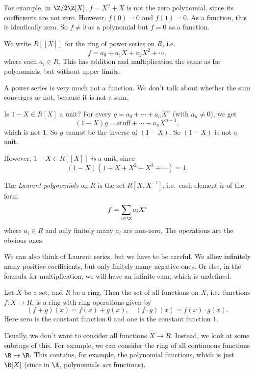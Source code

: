 \documentclass[a4paper]{article}
\begin{document}
For example, in $\Z/2\Z [X]$, $f = X^2 + X$ is not the zero polynomial, since its coefficients are not zero. However, $f(0) = 0$ and $f(1) = 0$. As a function, this is identically zero. So $f \not= 0$ as a polynomial but $f = 0$ as a function.

\begin{defi}
  We write $R[[X]]$ for the ring of power series on $R$, i.e.
  \[
    f = a_0 + a_1 X + a_2 X^2 + \cdots,
  \]
  where each $a_i \in R$. This has addition and multiplication the same as for polynomials, but without upper limits.
\end{defi}
A power series is very much not a function. We don't talk about whether the sum converges or not, because it is not a sum.

\begin{eg}
  Is $1 - X \in R[X]$ a unit? For every $g = a_0 + \cdots + a_n X^n$ (with $a_n \not= 0$), we get
  \[
    (1 - X)g = \text{stuff} + \cdots - a_n X^{n + 1},
  \]
  which is not $1$. So $g$ cannot be the inverse of $(1 - X)$. So $(1 - X)$ is not a unit.

  However, $1 - X \in R[[X]]$ \emph{is} a unit, since
  \[
    (1 - X)(1 + X + X^2 + X^3 + \cdots) = 1.
  \]
\end{eg}

\begin{defi}
  The \emph{Laurent polynomials} on $R$ is the set $R[X, X^{-1}]$, i.e.\ each element is of the form
  \[
    f = \sum_{i \in \Z} a_i X^i
  \]
  where $a_i \in R$ and only finitely many $a_i$ are non-zero. The operations are the obvious ones.
\end{defi}
We can also think of Laurent series, but we have to be careful. We allow infinitely many positive coefficients, but only finitely many negative ones. Or else, in the formula for multiplication, we will have an infinite sum, which is undefined.

\begin{eg}
  Let $X$ be a set, and $R$ be a ring. Then the set of all functions on $X$, i.e.\ functions $f: X \to R$, is a ring with ring operations given by
  \[
    (f + g)(x) = f(x) + g(x),\quad (f\cdot g)(x) = f(x) \cdot g(x).
  \]
  Here zero is the constant function $0$ and one is the constant function $1$.

  Usually, we don't want to consider all functions $X \to R$. Instead, we look at some subrings of this. For example, we can consider the ring of all continuous functions $\R \to \R$. This contains, for example, the polynomial functions, which is just $\R[X]$ (since in $\R$, polynomials \emph{are} functions).
\end{eg}
\end{document}
